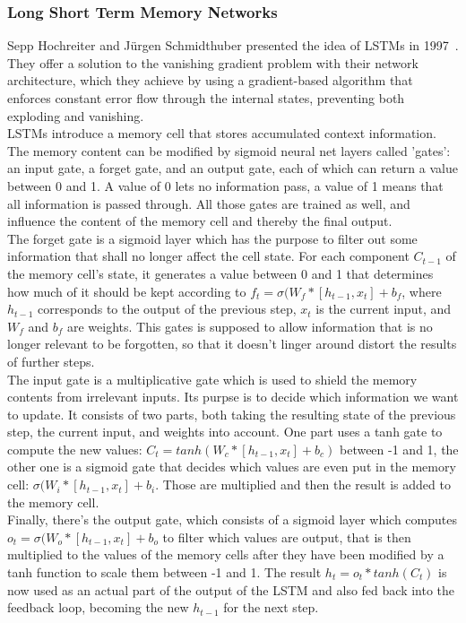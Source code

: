 \documentclass[
	a4paper,
	pagesize,
	pdftex,
	12pt,
	twoside, %
	BCOR=5mm, %
	ngerman,
	fleqn,
	final,
	]{scrartcl}
\begin{document}
\subsubsection{Long Short Term Memory Networks}\label{LSTM}
Sepp Hochreiter and Jürgen Schmidthuber presented the idea of LSTMs in 1997~\cite{Hochreiter.1997}. They offer a solution to the vanishing gradient problem with their network architecture, which they achieve by using a gradient-based algorithm that enforces constant error flow through the internal states, preventing both exploding and vanishing.\\
LSTMs introduce a memory cell that stores accumulated context information. The memory content can be modified by sigmoid neural net layers called 'gates': an input gate, a forget gate, and an output gate, each of which can return a value between 0 and 1. A value of 0 lets no information pass, a value of 1 means that all information is passed through. All those gates are trained as well, and influence the content of the memory cell and thereby the final output.\\
The forget gate is a sigmoid layer which has the purpose to filter out some information that shall no longer affect the cell state. For each component $C_{t-1}$ of the memory cell's state, it generates a value between 0 and 1 that determines how much of it should be kept according to $f_t = \sigma (W_f * [h_{t-1}, x_t] + b_f$, where $h_{t-1}$ corresponds to the output of the previous step, $x_t$ is the current input, and $W_f$ and $b_f$ are weights. This gates is supposed to allow information that is no longer relevant to be forgotten, so that it doesn't linger around distort the results of further steps.\\
The input gate is a multiplicative gate which is used to shield the memory contents from irrelevant inputs. Its purpse is to decide which information we want to update. It consists of two parts, both taking the resulting state of the previous step, the current input, and weights into account. One part uses a tanh gate to compute the new values: $C_t = tanh (W_c * [h_{t-1} , x_t] + b_c)$ between -1 and 1, the other one is a sigmoid gate that decides which values are even put in the memory cell: $\sigma (W_i * [h_{t-1}, x_t] + b_i$. Those are multiplied and then the result is added to the memory cell.\\
Finally, there's the output gate, which consists of a sigmoid layer which computes $o_t = \sigma (W_o * [h_{t-1}, x_t] + b_o$ to filter which values are output, that is then multiplied to the values of the memory cells after they have been modified by a tanh function to scale them between -1 and 1. The result $h_t = o_t * tanh(C_t)$ is now used as an actual part of the output of the LSTM and also fed back into the feedback loop, becoming the new $h_{t-1}$ for the next step.\\
\end{document}
